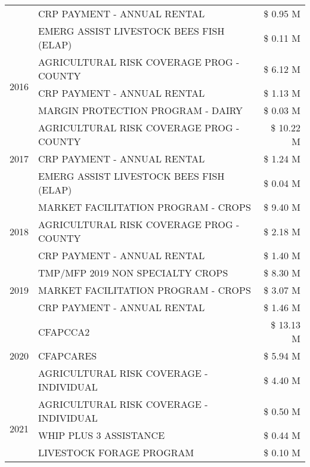 \begin{tabular}{llr}
 & CRP PAYMENT - ANNUAL RENTAL & \$ 0.95 M \\
 & EMERG ASSIST LIVESTOCK BEES FISH (ELAP) & \$ 0.11 M \\
\cline{1-3}
\multirow[t]{3}{*}{2016} & AGRICULTURAL RISK COVERAGE PROG - COUNTY & \$ 6.12 M \\
 & CRP PAYMENT - ANNUAL RENTAL & \$ 1.13 M \\
 & MARGIN PROTECTION PROGRAM - DAIRY & \$ 0.03 M \\
\cline{1-3}
\multirow[t]{3}{*}{2017} & AGRICULTURAL RISK COVERAGE PROG - COUNTY & \$ 10.22 M \\
 & CRP PAYMENT - ANNUAL RENTAL & \$ 1.24 M \\
 & EMERG ASSIST LIVESTOCK BEES FISH (ELAP) & \$ 0.04 M \\
\cline{1-3}
\multirow[t]{3}{*}{2018} & MARKET FACILITATION PROGRAM - CROPS & \$ 9.40 M \\
 & AGRICULTURAL RISK COVERAGE PROG - COUNTY & \$ 2.18 M \\
 & CRP PAYMENT - ANNUAL RENTAL & \$ 1.40 M \\
\cline{1-3}
\multirow[t]{3}{*}{2019} & TMP/MFP 2019 NON SPECIALTY CROPS & \$ 8.30 M \\
 & MARKET FACILITATION PROGRAM - CROPS & \$ 3.07 M \\
 & CRP PAYMENT - ANNUAL RENTAL & \$ 1.46 M \\
\cline{1-3}
\multirow[t]{3}{*}{2020} & CFAPCCA2 & \$ 13.13 M \\
 & CFAPCARES & \$ 5.94 M \\
 & AGRICULTURAL RISK COVERAGE - INDIVIDUAL & \$ 4.40 M \\
\cline{1-3}
\multirow[t]{3}{*}{2021} & AGRICULTURAL RISK COVERAGE - INDIVIDUAL & \$ 0.50 M \\
 & WHIP PLUS 3 ASSISTANCE & \$ 0.44 M \\
 & LIVESTOCK FORAGE PROGRAM & \$ 0.10 M \\
\cline{1-3}
\bottomrule
\end{tabular}
